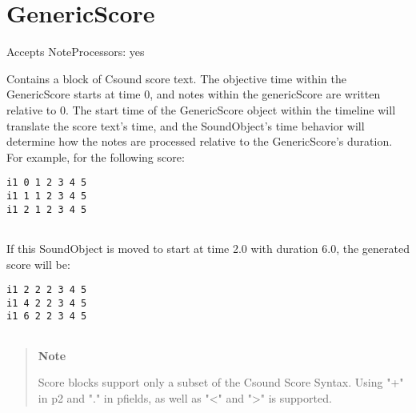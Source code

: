 \section{GenericScore}\label{genericScore}

Accepts NoteProcessors: yes

Contains a block of Csound score text. The objective time within the
GenericScore starts at time 0, and notes within the genericScore are
written relative to 0. The start time of the GenericScore object within
the timeline will translate the score text's time, and the SoundObject's
time behavior will determine how the notes are processed relative to the
GenericScore's duration. For example, for the following score:

\begin{verbatim}
i1 0 1 2 3 4 5
i1 1 1 2 3 4 5
i1 2 1 2 3 4 5
  
\end{verbatim}

If this SoundObject is moved to start at time 2.0 with duration 6.0, the
generated score will be:

\begin{verbatim}
i1 2 2 2 3 4 5
i1 4 2 2 3 4 5
i1 6 2 2 3 4 5
  
\end{verbatim}

\begin{quote}
\textbf{Note}

Score blocks support only a subset of the Csound Score Syntax. Using "+"
in p2 and "." in pfields, as well as "\textless{}" and "\textgreater{}"
is supported.
\end{quote}

